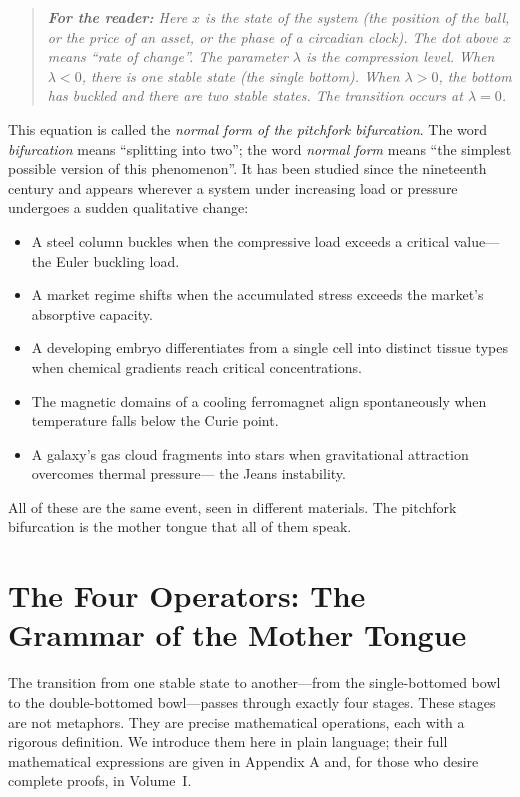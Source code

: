 \documentclass[12pt, oneside]{book}
\theoremstyle{plain}
\theoremstyle{definition}
\theoremstyle{remark}
\newenvironment{fortheread}[1]{%
  \begin{quote}\small\itshape\textbf{For the reader:} #1\quad}
  {\end{quote}}
\begin{document}
\begin{fortheread}{Here $x$ is the state of the system (the
position of the ball, or the price of an asset, or the phase
of a circadian clock). The dot above $x$ means ``rate of change''.
The parameter $\lambda$ is the compression level. When $\lambda < 0$,
there is one stable state (the single bottom). When $\lambda > 0$,
the bottom has buckled and there are two stable states. The
transition occurs at $\lambda = 0$.}
\end{fortheread}

This equation is called the \emph{normal form of the pitchfork
bifurcation}. The word \emph{bifurcation} means ``splitting into
two''; the word \emph{normal form} means ``the simplest possible
version of this phenomenon''. It has been studied since the
nineteenth century and appears wherever a system under increasing
load or pressure undergoes a sudden qualitative change:

\begin{itemize}
  \item A steel column buckles when the compressive load exceeds
    a critical value---the Euler buckling load.
  \item A market regime shifts when the accumulated stress
    exceeds the market's absorptive capacity.
  \item A developing embryo differentiates from a single cell
    into distinct tissue types when chemical gradients reach
    critical concentrations.
  \item The magnetic domains of a cooling ferromagnet align
    spontaneously when temperature falls below the Curie point.
  \item A galaxy's gas cloud fragments into stars when
    gravitational attraction overcomes thermal pressure---
    the Jeans instability.
\end{itemize}

All of these are the same event, seen in different materials.
The pitchfork bifurcation is the mother tongue that all of them
speak.

\section{The Four Operators: The Grammar of the Mother Tongue}

The transition from one stable state to another---from the
single-bottomed bowl to the double-bottomed bowl---passes through
exactly four stages. These stages are not metaphors. They are
precise mathematical operations, each with a rigorous definition.
We introduce them here in plain language; their full mathematical
expressions are given in Appendix A and, for those who desire
complete proofs, in Volume~I.
\end{document}

